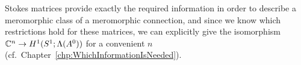 Stokes matrices provide exactly the required information in order to describe a
meromorphic class of a meromorphic connection, and since we know which
restrictions hold for these matrices, we can explicitly give the isomorphism
$\mathbb{C}^n\to H^1(S^1;\Lambda(A^0))$ for a convenient $n$
(cf.\ Chapter~\ref{chp:WhichInformationIsNeeded}).

\begin{comment}
  \begin{enumerate}
    \item first introduce asymptotic analysis
    \item then define languages for meromorphic connections or systems
    \item talk about Stokes structures
    \item more?
  \end{enumerate}
\end{comment}

